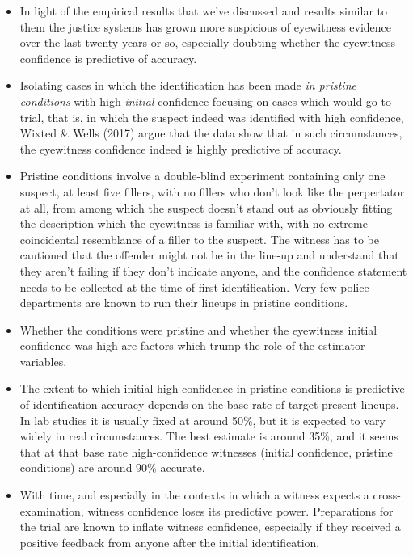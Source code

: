\documentclass[
  10pt,
  dvipsnames,enabledeprecatedfontcommands]{scrartcl}
\begin{document}
\begin{itemize}
\item
  In light of the empirical results that we've discussed and results
  similar to them the justice systems has grown more suspicious of
  eyewitness evidence over the last twenty years or so, especially
  doubting whether the eyewitness confidence is predictive of accuracy.
\item
  Isolating cases in which the identification has been made
  \emph{in pristine conditions} with high \emph{initial} confidence
  focusing on cases which would go to trial, that is, in which the
  suspect indeed was identified with high confidence, Wixted \& Wells
  (2017) argue that the data show that in such circumstances, the
  eyewitness confidence indeed is highly predictive of accuracy.
\item
  Pristine conditions involve a double-blind experiment containing only
  one suspect, at least five fillers, with no fillers who don't look
  like the perpertator at all, from among which the suspect doesn't
  stand out as obviously fitting the description which the eyewitness is
  familiar with, with no extreme coincidental resemblance of a filler to
  the suspect. The witness has to be cautioned that the offender might
  not be in the line-up and understand that they aren't failing if they
  don't indicate anyone, and the confidence statement needs to be
  collected at the time of first identification. Very few police
  departments are known to run their lineups in pristine conditions.
\item
  Whether the conditions were pristine and whether the eyewitness
  initial confidence was high are factors which trump the role of the
  estimator variables.
\item
  The extent to which initial high confidence in pristine conditions is
  predictive of identification accuracy depends on the base rate of
  target-present lineups. In lab studies it is usually fixed at around
  50\%, but it is expected to vary widely in real circumstances. The
  best estimate is around 35\%, and it seems that at that base rate
  high-confidence witnesses (initial confidence, pristine conditions)
  are around 90\% accurate.
\item
  With time, and especially in the contexts in which a witness expects a
  cross-examination, witness confidence loses its predictive power.
  Preparations for the trial are known to inflate witness confidence,
  especially if they received a positive feedback from anyone after the
  initial identification.
\end{itemize}
\end{document}
